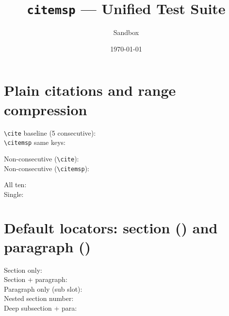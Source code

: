 \documentclass[11pt, a4paper]{article}
\begin{document}
\title{\texttt{citemsp} --- Unified Test Suite}
\author{Sandbox}
\date{\today}
\maketitle

\tableofcontents
\newpage

\section{Plain citations and range compression}

\noindent
\texttt{\textbackslash cite} baseline (5 consecutive):
\cite{einstein1915,schwarzschild1916,wald1984,hawking1974,misner1973} \\
\texttt{\textbackslash citemsp} same keys:

\medskip\noindent
Non-consecutive (\texttt{\textbackslash cite}):
\cite{einstein1915,schwarzschild1916,wald1984,misner1973,penrose1965,kerr1963} \\
Non-consecutive (\texttt{\textbackslash citemsp}):

\medskip\noindent
All ten:
 \\
Single: 


\section{Default locators: section (\textsection) and paragraph (\textparagraph)}

\noindent
Section only:               \\
Section + paragraph:        \\
Paragraph only (sub slot):  \\
Nested section number:      \\
Deep subsection + para:    
\end{document}
